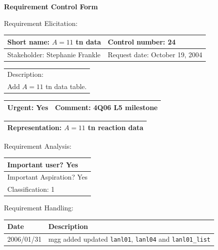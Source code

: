 \begin{center}\Large\bf
Requirement Control Form
\end{center}
\vspace{24pt}

Requirement Elicitation:

\begin{tabular}{|p{211pt}|p{211pt}|} \hline
Short name: $A = 11$ tn data & Control number: 24\\ \hline
Stakeholder: Stephanie Frankle & Request date: October 19, 2004\\
\end{tabular}
\begin{tabular}{|p{433pt}|} \hline
Description: \\ 
Add $A=11$ tn data table. \\
\hline
\end{tabular} 
\begin{tabular}{|p{211pt}|p{211pt}|} \hline
Urgent: Yes & Comment: 4Q06 L5 milestone\\ \hline
\end{tabular}

\vspace{12pt}

\begin{tabular}{|p{433pt}|} \hline
Representation: $A=11$ tn reaction data \\ \hline
\end{tabular}
\vspace{24pt}

Requirement Analysis:

\begin{tabular}{|p{433pt}|} \hline
Important user? Yes \\ \hline
Important Aspiration? Yes \\ \hline
Classification: 1 \\ \hline
\end{tabular}
\vspace{24pt}

Requirement Handling:

\begin{tabular}{|p{72pt}|p{351pt}|} \hline
Date & Description \\ \hline
2006/01/31 & mgg added updated \texttt{lanl01}, \texttt{lanl04} and
\texttt{lanl01\_list} \\ \hline
\end{tabular}

